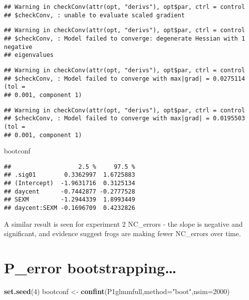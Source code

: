 \documentclass[]{article}
\newenvironment{Shaded}{\begin{snugshade}}{\end{snugshade}}
\newcommand{\KeywordTok}[1]{\textcolor[rgb]{0.13,0.29,0.53}{\textbf{#1}}}
\newcommand{\DataTypeTok}[1]{\textcolor[rgb]{0.13,0.29,0.53}{#1}}
\newcommand{\DecValTok}[1]{\textcolor[rgb]{0.00,0.00,0.81}{#1}}
\newcommand{\StringTok}[1]{\textcolor[rgb]{0.31,0.60,0.02}{#1}}
\newcommand{\NormalTok}[1]{#1}
\begin{document}
\begin{verbatim}
## Warning in checkConv(attr(opt, "derivs"), opt$par, ctrl = control
## $checkConv, : unable to evaluate scaled gradient
\end{verbatim}

\begin{verbatim}
## Warning in checkConv(attr(opt, "derivs"), opt$par, ctrl = control
## $checkConv, : Model failed to converge: degenerate Hessian with 1 negative
## eigenvalues
\end{verbatim}

\begin{verbatim}
## Warning in checkConv(attr(opt, "derivs"), opt$par, ctrl = control
## $checkConv, : Model failed to converge with max|grad| = 0.0275114 (tol =
## 0.001, component 1)
\end{verbatim}

\begin{verbatim}
## Warning in checkConv(attr(opt, "derivs"), opt$par, ctrl = control
## $checkConv, : Model failed to converge with max|grad| = 0.0195503 (tol =
## 0.001, component 1)
\end{verbatim}

\begin{Shaded}
\begin{Highlighting}[]
\NormalTok{bootconf}
\end{Highlighting}
\end{Shaded}

\begin{verbatim}
##                   2.5 %     97.5 %
## .sig01        0.3362997  1.6725883
## (Intercept)  -1.9631716  0.3125134
## daycent      -0.7442877 -0.2777528
## SEXM         -1.2944339  1.8993449
## daycent:SEXM -0.1696709  0.4232826
\end{verbatim}

A similar result is seen for experiment 2 NC\_errors - the slope is
negative and significant, and evidence suggest frogs are making fewer
NC\_errors over time.

\section{P\_error bootstrapping\ldots{}}\label{p_error-bootstrapping}

\begin{Shaded}
\begin{Highlighting}[]
\KeywordTok{set.seed}\NormalTok{(}\DecValTok{4}\NormalTok{)}
\NormalTok{bootconf <-}\StringTok{ }\KeywordTok{confint}\NormalTok{(P1glmmfull,}\DataTypeTok{method=}\StringTok{"boot"}\NormalTok{,}\DataTypeTok{nsim=}\DecValTok{2000}\NormalTok{)}
\end{Highlighting}
\end{Shaded}
\end{document}
